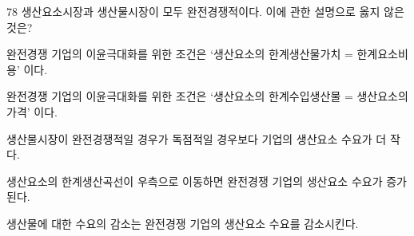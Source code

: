 \begin{question}{78}
생산요소시장과 생산물시장이 모두 완전경쟁적이다. 이에 관한 설명으로 옳지 않은 것은?
\begin{choices}
  \item 완전경쟁 기업의 이윤극대화를 위한 조건은 ‘생산요소의 한계생산물가치 = 한계요소비용’ 이다.
  \item 완전경쟁 기업의 이윤극대화를 위한 조건은 ‘생산요소의 한계수입생산물 = 생산요소의 가격’ 이다.
  \item 생산물시장이 완전경쟁적일 경우가 독점적일 경우보다 기업의 생산요소 수요가 더 작다.
  \item 생산요소의 한계생산곡선이 우측으로 이동하면 완전경쟁 기업의 생산요소 수요가 증가된다.
  \item 생산물에 대한 수요의 감소는 완전경쟁 기업의 생산요소 수요를 감소시킨다.
\end{choices}
\end{question}

